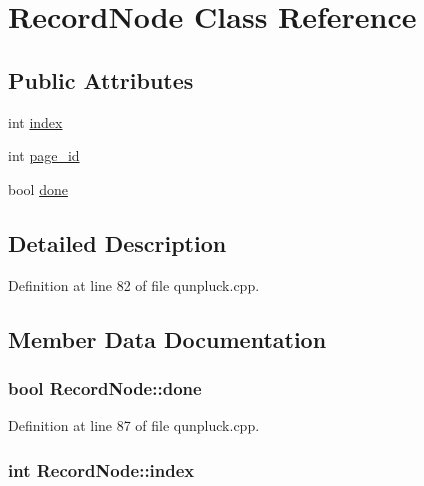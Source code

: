 \hypertarget{classRecordNode}{\section{Record\+Node Class Reference}
\label{classRecordNode}
}
\subsection*{Public Attributes}
\begin{DoxyCompactItemize}
\item 
int \hyperlink{classRecordNode_ad1acd3d792d71ceb555397cccd5bee4f}{index}
\item 
int \hyperlink{classRecordNode_a2d55d8075e219111e55c8740707f562c}{page\+\_\+id}
\item 
bool \hyperlink{classRecordNode_ae5b16e702e49eb8c63a2b1ae329dd94d}{done}
\end{DoxyCompactItemize}


\subsection{Detailed Description}


Definition at line 82 of file qunpluck.\+cpp.



\subsection{Member Data Documentation}
\hypertarget{classRecordNode_ae5b16e702e49eb8c63a2b1ae329dd94d}{
\subsubsection[{done}]{\setlength{\rightskip}{0pt plus 5cm}bool Record\+Node\+::done}}\label{classRecordNode_ae5b16e702e49eb8c63a2b1ae329dd94d}


Definition at line 87 of file qunpluck.\+cpp.

\hypertarget{classRecordNode_ad1acd3d792d71ceb555397cccd5bee4f}{
\subsubsection[{index}]{\setlength{\rightskip}{0pt plus 5cm}int Record\+Node\+::index}}\label{classRecordNode_ad1acd3d792d71ceb555397cccd5bee4f}


